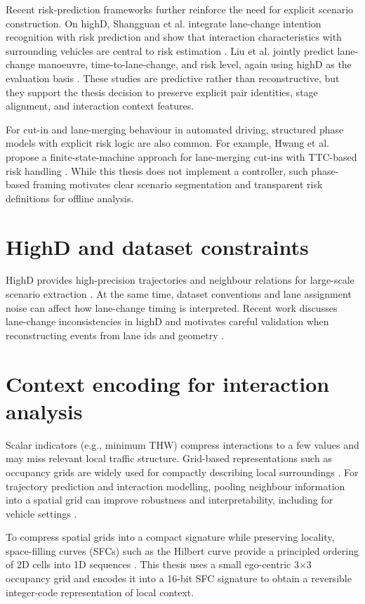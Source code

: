 \documentclass[12pt,a4paper,twoside,openright]{report}
\begin{document}
    Recent risk-prediction frameworks further reinforce the need for explicit scenario construction. On highD, Shangguan et al. integrate lane-change intention recognition with risk prediction and show that interaction characteristics with surrounding vehicles are central to risk estimation \cite{shangguan2022}. Liu et al. jointly predict lane-change manoeuvre, time-to-lane-change, and risk level, again using highD as the evaluation basis \cite{liu2025multitask}. These studies are predictive rather than reconstructive, but they support the thesis decision to preserve explicit pair identities, stage alignment, and interaction context features.

    For cut-in and lane-merging behaviour in automated driving, structured phase models with explicit risk logic are also common. For example, Hwang et al. propose a finite-state-machine approach for lane-merging cut-ins with TTC-based risk handling \cite{hwang2022fsmrl}. While this thesis does not implement a controller, such phase-based framing motivates clear scenario segmentation and transparent risk definitions for offline analysis.

    \section{HighD and dataset constraints}
    HighD provides high-precision trajectories and neighbour relations for large-scale scenario extraction \cite{highd_2018}. At the same time, dataset conventions and lane assignment noise can affect how lane-change timing is interpreted. Recent work discusses lane-change inconsistencies in highD and motivates careful validation when reconstructing events from lane ids and geometry \cite{wanggao2025highd}.

    \section{Context encoding for interaction analysis}
    Scalar indicators (e.g., minimum THW) compress interactions to a few values and may miss relevant local traffic structure. Grid-based representations such as occupancy grids are widely used for compactly describing local surroundings \cite{elfes1989}. For trajectory prediction and interaction modelling, pooling neighbour information into a spatial grid can improve robustness and interpretability, including for vehicle settings \cite{deo2018}.

    To compress spatial grids into a compact signature while preserving locality, space-filling curves (SFCs) such as the Hilbert curve provide a principled ordering of 2D cells into 1D sequences \cite{hilbert1891,moon2001}. This thesis uses a small ego-centric 3$\times$3 occupancy grid and encodes it into a 16-bit SFC signature to obtain a reversible integer-code representation of local context.
\end{document}

